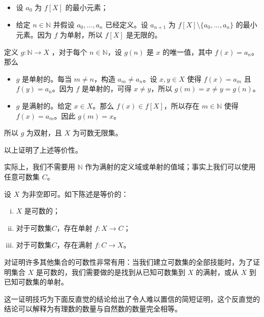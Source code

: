 \begin{cproof}
\begin{itemize}
\begin{itemize}
\item 设 $a_0$ 为 $f[X]$ 的最小元素；
\item 给定 $n \in \mathbb{N}$ 并假设 $a_0, \dots, a_n$ 已经定义。设 $a_{n+1}$ 为 $f[X] \setminus \{ a_0, \dots, a_n \}$ 的最小元素。因为 $f$ 为单射，所以 $f[X]$ 是无限的。 
\end{itemize}
定义 $g : \mathbb{N} \to X$ ，对于每个 $n \in \mathbb{N}$，设 $g(n)$ 是 $x$ 的唯一值，其中 $f(x)=a_n$。那么
\begin{itemize}
\item $g$ 是单射的。每当 $m \ne n$，构造 $a_m \ne a_n$。设 $x,y \in X$ 使得 $f(x)=a_m$ 且 $f(y)=a_n$。因为 $f$ 是单射的，可得 $x \ne y$，所以 $g(m) = x \ne y = g(n)$。
\item $g$ 是满射的。给定 $x \in X$。那么 $f(x) \in f[X]$，所以存在 $m \in \mathbb{N}$ 使得 $f(x)=a_m$。因此 $g(m)=x$。
\end{itemize}
所以 $g$ 为双射，且 $X$ 为可数无限集。
\end{itemize}
以上证明了上述等价性。
\end{cproof}

实际上，我们不需要用 $\mathbb{N}$ 作为满射的定义域或单射的值域；事实上我们可以使用任意可数集 $C$。

\begin{exercise}
\label{exCountabilityFromInjectionsAndSurjections}
设 $X$ 为非空即可。如下陈述是等价的：
\begin{enumerate}[(i)]
\item \label{itmInjectionSurjectionCountableSets} $X$ 是可数的；
\item \label{itmInjectionIntoCountableSet} 对于可数集$C$，存在单射 $f : X \to C$；
\item \label{itmSurjectionFromCountableSet} 对于可数集$C$，存在满射 $f : C \to X$。
\end{enumerate}
\end{exercise}

 对证明许多其他集合的可数性非常有用：当我们建立可数集的全部技能时，为了证明集合 $X$ 是可数的，我们需要做的是找到从已知可数集到 $X$ 的满射，或从 $X$ 到已知可数集的单射。

这一证明技巧为下面反直觉的结论给出了令人难以置信的简短证明，这个反直觉的结论可以解释为有理数的数量与自然数的数量完全相等。

